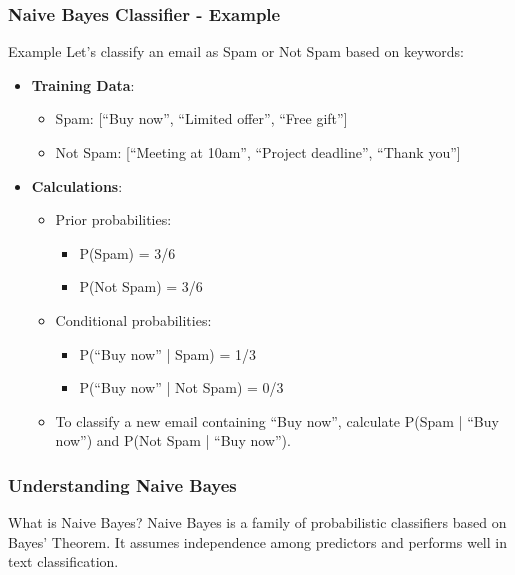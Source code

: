 \documentclass[aspectratio=169]{beamer}
\begin{document}
\begin{frame}[fragile]
  \frametitle{Naive Bayes Classifier - Example}
  \begin{block}{Example}
    Let's classify an email as Spam or Not Spam based on keywords:

    \begin{itemize}
      \item \textbf{Training Data}:
      \begin{itemize}
        \item Spam: [“Buy now”, “Limited offer”, “Free gift”]
        \item Not Spam: [“Meeting at 10am”, “Project deadline”, “Thank you”]
      \end{itemize}
      
      \item \textbf{Calculations}:
      \begin{itemize}
        \item Prior probabilities:
        \begin{itemize}
          \item P(Spam) = 3/6
          \item P(Not Spam) = 3/6
        \end{itemize}
        \item Conditional probabilities:
        \begin{itemize}
          \item P(“Buy now” | Spam) = 1/3
          \item P(“Buy now” | Not Spam) = 0/3
        \end{itemize}
        \item To classify a new email containing “Buy now”, calculate P(Spam | “Buy now”) and P(Not Spam | “Buy now”).
      \end{itemize}
    \end{itemize}
  \end{block}
\end{frame}

\begin{frame}[fragile]
    \frametitle{Understanding Naive Bayes}
    \begin{block}{What is Naive Bayes?}
        Naive Bayes is a family of probabilistic classifiers based on Bayes’ Theorem. It assumes independence among predictors and performs well in text classification.
    \end{block}
\end{frame}
\end{document}

